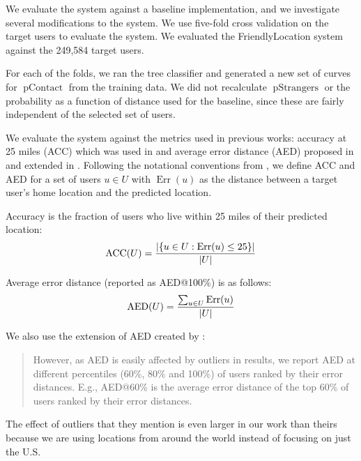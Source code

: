 \documentclass[letterpaper]{article}
\DeclareMathOperator{\pContact}{pContact}
\DeclareMathOperator{\pStrangers}{pStrangers}
\DeclareMathOperator{\Err}{Err}
\DeclareMathOperator{\AED}{AED}
\DeclareMathOperator{\ACC}{ACC}
\begin{document}
We evaluate the system against a baseline implementation, and we investigate
several modifications to the system.
%
We use five-fold cross validation on the target users to evaluate the system.
We evaluated the FriendlyLocation system against the 249,584 target users.

For each of the folds, we ran the tree classifier and generated a new set of
curves for $\pContact$ from the training data.
%
We did not recalculate $\pStrangers$ or the probability as a function of distance
used for the baseline, since these are fairly independent of the selected set
of users.

We evaluate the system against the metrics used in previous works:
accuracy at 25 miles (ACC) which was used in \cite{backstrom2010find}
and average error distance (AED) proposed in \cite{cheng2010you} and
extended in \cite{li2012towards}.
%
Following the notational conventions from \cite{li2012towards}, we define ACC
and AED for a set of users $u \in U$ with $\Err(u)$ as the distance between a
target user's home location and the predicted location.

Accuracy is the fraction of users who live within 25 miles of their predicted
location:
\[
    \ACC(U) = { |\{ u \in U : \Err(u)\le25 \}| \over |U| }
\]

Average error distance (reported as AED@100\%) is as follows:
\[
    \AED(U) = { \sum_{u \in U} \Err(u) \over |U| }
\]

We also use the extension of AED created by \cite{li2012towards}:
\begin{quote}
However, as AED is easily affected by outliers in results, we report AED at
different percentiles (60\%, 80\% and 100\%) of users ranked by their error
distances. E.g., AED@60\% is the average error distance of the top 60\% of
users ranked by their error distances.
\end{quote}
The effect of outliers that they mention is even larger in our work than theirs
because we are using locations from around the world instead of focusing on
just the U.S.
\end{document}
